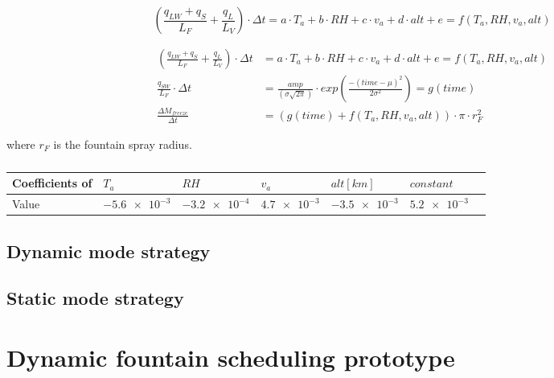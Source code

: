 \documentclass[utf8]{frontiersSCNS}
\begin{document}
\begin{equation}
		\label{eqn:T}
   (\frac{q_{LW} + q_{S}}{L_F} + \frac{q_L}{L_V}) \cdot \Delta t = a \cdot T_a + b \cdot RH + c \cdot v_a +
  d \cdot alt + e = f(T_a, RH, v_a, alt)
\end{equation}

\begin{subequations}
	\begin{align}
		\label{eqn:T}
   (\frac{q_{LW} + q_{S}}{L_F} + \frac{q_L}{L_V}) \cdot \Delta t & = a \cdot T_a + b \cdot RH + c \cdot v_a +
  d \cdot alt + e = f(T_a, RH, v_a, alt) \\
		\label{eqn:sun}
  \frac{q_{SW}}{L_F}\cdot \Delta t & = \frac{amp}{(\sigma \sqrt{2\pi})} \cdot
  exp\left(\frac{-(time-\mu)^2}{2\sigma^2}\right) = g(time)  \\
		\label{eqn:auto}
  \frac{\Delta M_{freeze}}{\Delta t} &= (g(time) + f(T_a, RH, v_a, alt)) \cdot \pi \cdot r_F^2 
	\end{align}
\end{subequations}

where $r_F$ is the fountain spray radius.


\begin{table}[ht]
\centering
\caption{}
\label{tab:my-table}
\begin{tabular}{@{}lllllll@{}}
\toprule
Coefficients of & $T_a$ & $RH$ & $v_a$ & $alt [km]$  & $constant$ \\ \midrule
Value           & $\num{-5.6 e-3}$     & $\num{-3.2 e-4}$ & $\num{4.7 e-3}$ & $\num{-3.5 e-3}$  & $\num{5.2 e-3}$
                \\ \bottomrule
\end{tabular}
\end{table}

\subsection{Dynamic mode strategy}

\subsection{Static mode strategy}

\section{Dynamic fountain scheduling prototype}
\end{document}
